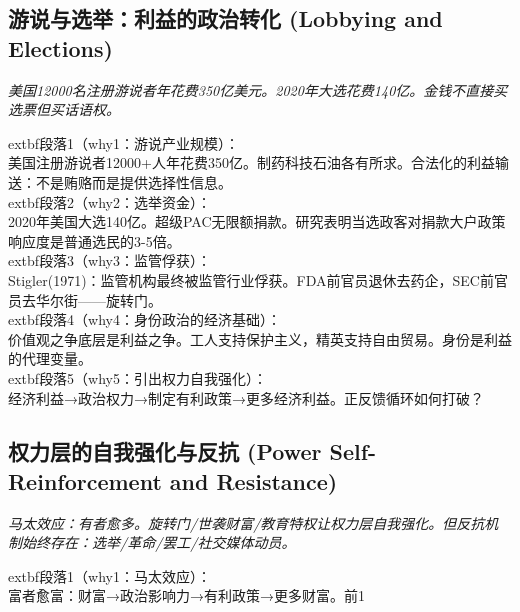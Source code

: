 \documentclass[a4paper,12pt]{book}
\newenvironment{motivation}{\begin{tcolorbox}[colback=gray!10,colframe=gray!60,title=\textit{动机}]\small\itshape}{\end{tcolorbox}}
\begin{document}
\begin{motivation}
\begin{motivation}
\begin{motivation}
	\subsection{游说与选举：利益的政治转化 (Lobbying and Elections)}
	\begin{motivation}美国12000名注册游说者年花费350亿美元。2020年大选花费140亿。金钱不直接买选票但买话语权。\end{motivation}
		extbf{段落1（why1：游说产业规模）}：\\美国注册游说者12000+人年花费350亿。制药科技石油各有所求。合法化的利益输送：不是贿赂而是提供选择性信息。\\	extbf{段落2（why2：选举资金）}：\\2020年美国大选140亿。超级PAC无限额捐款。研究表明当选政客对捐款大户政策响应度是普通选民的3-5倍。\\	extbf{段落3（why3：监管俘获）}：\\Stigler(1971)：监管机构最终被监管行业俘获。FDA前官员退休去药企，SEC前官员去华尔街——旋转门。\\	extbf{段落4（why4：身份政治的经济基础）}：\\价值观之争底层是利益之争。工人支持保护主义，精英支持自由贸易。身份是利益的代理变量。\\	extbf{段落5（why5：引出权力自我强化）}：\\经济利益→政治权力→制定有利政策→更多经济利益。正反馈循环如何打破？

	\subsection{权力层的自我强化与反抗 (Power Self-Reinforcement and Resistance)}
	\begin{motivation}马太效应：有者愈多。旋转门/世袭财富/教育特权让权力层自我强化。但反抗机制始终存在：选举/革命/罢工/社交媒体动员。\end{motivation}
		extbf{段落1（why1：马太效应）}：\\富者愈富：财富→政治影响力→有利政策→更多财富。前1%


\end{motivation}
\end{motivation}
\end{motivation}
\end{document}
